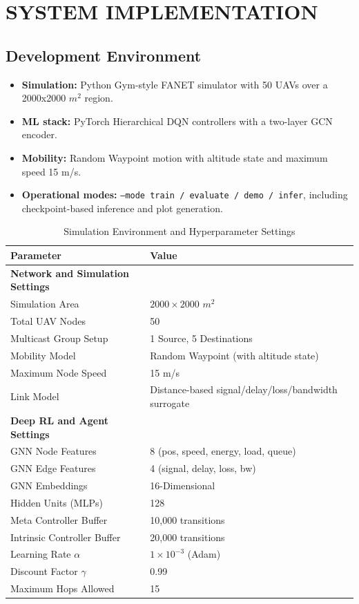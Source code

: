 \documentclass[conference]{IEEEtran}
\begin{document}
\section{SYSTEM IMPLEMENTATION}
\subsection{Development Environment}
\begin{itemize}
    \item \textbf{Simulation:} Python Gym-style FANET simulator with 50 UAVs over a 2000x2000 $m^2$ region.
    \item \textbf{ML stack:} PyTorch Hierarchical DQN controllers with a two-layer GCN encoder.
    \item \textbf{Mobility:} Random Waypoint motion with altitude state and maximum speed 15 m/s.
    \item \textbf{Operational modes:} \texttt{--mode train / evaluate / demo / infer}, including checkpoint-based inference and plot generation.
\end{itemize}

\begin{table}[htbp]
\centering
\caption{Simulation Environment and Hyperparameter Settings}
\renewcommand{\arraystretch}{1.3}
\begin{tabular}{|l|l|}
\hline
\textbf{Parameter} & \textbf{Value} \\
\hline
\textbf{Network and Simulation Settings} & \\
Simulation Area & $2000 \times 2000$ $m^2$ \\
Total UAV Nodes & 50 \\
Multicast Group Setup & 1 Source, 5 Destinations \\
Mobility Model & Random Waypoint (with altitude state) \\
Maximum Node Speed & 15 m/s \\
Link Model & Distance-based signal/delay/loss/bandwidth surrogate \\
\hline
\textbf{Deep RL and Agent Settings} & \\
GNN Node Features & 8 (pos, speed, energy, load, queue) \\
GNN Edge Features & 4 (signal, delay, loss, bw) \\
GNN Embeddings & 16-Dimensional \\
Hidden Units (MLPs) & 128 \\
Meta Controller Buffer & 10,000 transitions \\
Intrinsic Controller Buffer & 20,000 transitions \\
Learning Rate $\alpha$ & $1 \times 10^{-3}$ (Adam) \\
Discount Factor $\gamma$ & 0.99 \\
Maximum Hops Allowed & 15 \\
\hline
\end{tabular}
\label{tab:sim_parameters}
\end{table}
\end{document}
